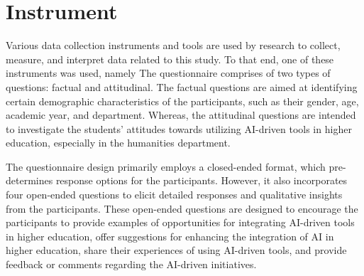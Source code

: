 \section{Instrument}
\justifying

Various data collection instruments and tools are used by research to collect, measure, and interpret data related to this study. 
To that end, one of these instruments was used, namely  The questionnaire comprises of two types 
of questions: factual and attitudinal. The factual questions are aimed at identifying certain demographic characteristics
of the participants, such as their gender, age, academic year, and department. Whereas, the attitudinal questions
are intended to investigate the students' attitudes towards utilizing AI-driven tools in higher education, 
especially in the humanities department. 


The questionnaire design primarily employs a closed-ended format, which pre-determines response 
options for the participants. However, it also incorporates four open-ended questions to elicit 
detailed responses and qualitative insights from the participants. These open-ended questions are 
designed to encourage the participants to provide examples of opportunities for integrating AI-driven 
tools in higher education, offer suggestions for enhancing the integration of AI in higher education, 
share their experiences of using AI-driven tools, and provide feedback or comments regarding the AI-driven initiatives.







